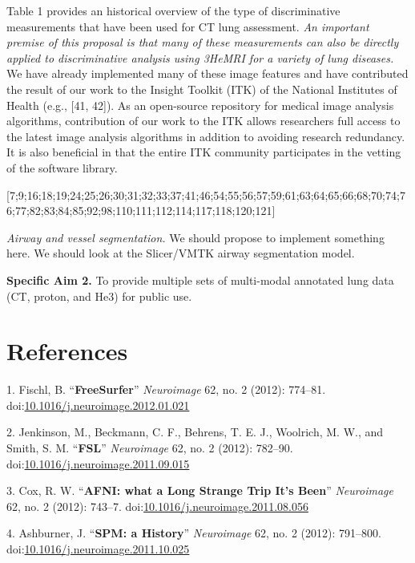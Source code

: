 \documentclass[11pt,]{article}
\begin{document}
Table 1 provides an historical overview of the type of discriminative
measurements that have been used for CT lung assessment. \emph{An
important premise of this proposal is that many of these measurements
can also be directly applied to discriminative analysis using 3HeMRI for
a variety of lung diseases.} We have already implemented many of these
image features and have contributed the result of our work to the
Insight Toolkit (ITK) of the National Institutes of Health (e.g., {[}41,
42{]}). As an open-source repository for medical image analysis
algorithms, contribution of our work to the ITK allows researchers full
access to the latest image analysis algorithms in addition to avoiding
research redundancy. It is also beneficial in that the entire ITK
community participates in the vetting of the software library.

{[}7;9;16;18;19;24;25;26;30;31;32;33;37;41;46;54;55;56;57;59;61;63;64;65;66;68;70;74;76;77;82;83;84;85;92;98;110;111;112;114;117;118;120;121{]}

\emph{Airway and vessel segmentation.} We should propose to implement
something here. We should look at the Slicer/VMTK airway segmentation
model.

\textbf{Specific Aim 2.} To provide multiple sets of multi-modal
annotated lung data (CT, proton, and He3) for public use.

 \clearpage

\newpage

\section*{References}\label{references}

1. Fischl, B. ``\textbf{FreeSurfer}'' \emph{Neuroimage} 62, no. 2
(2012): 774--81.
doi:\href{http://dx.doi.org/10.1016/j.neuroimage.2012.01.021}{10.1016/j.neuroimage.2012.01.021}

2. Jenkinson, M., Beckmann, C. F., Behrens, T. E. J., Woolrich, M. W.,
and Smith, S. M. ``\textbf{FSL}'' \emph{Neuroimage} 62, no. 2 (2012):
782--90.
doi:\href{http://dx.doi.org/10.1016/j.neuroimage.2011.09.015}{10.1016/j.neuroimage.2011.09.015}

3. Cox, R. W. ``\textbf{AFNI: what a Long Strange Trip It's Been}''
\emph{Neuroimage} 62, no. 2 (2012): 743--7.
doi:\href{http://dx.doi.org/10.1016/j.neuroimage.2011.08.056}{10.1016/j.neuroimage.2011.08.056}

4. Ashburner, J. ``\textbf{SPM: a History}'' \emph{Neuroimage} 62, no. 2
(2012): 791--800.
doi:\href{http://dx.doi.org/10.1016/j.neuroimage.2011.10.025}{10.1016/j.neuroimage.2011.10.025}
\end{document}
